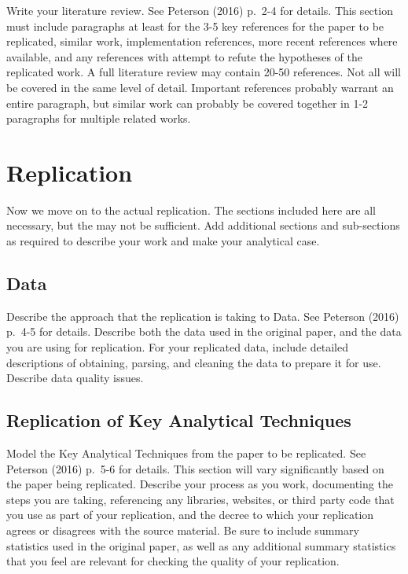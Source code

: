 \documentclass{article}
\begin{document}
Write your literature review. See Peterson (2016) p.~2-4 for details.
This section must include paragraphs at least for the 3-5 key references
for the paper to be replicated, similar work, implementation references,
more recent references where available, and any references with attempt
to refute the hypotheses of the replicated work. A full literature
review may contain 20-50 references. Not all will be covered in the same
level of detail. Important references probably warrant an entire
paragraph, but similar work can probably be covered together in 1-2
paragraphs for multiple related works.

\hypertarget{replication}{%
\section{Replication}\label{replication}}

Now we move on to the actual replication. The sections included here are
all necessary, but the may not be sufficient. Add additional sections
and sub-sections as required to describe your work and make your
analytical case.

\hypertarget{data}{%
\subsection{Data}\label{data}}

Describe the approach that the replication is taking to Data. See
Peterson (2016) p.~4-5 for details. Describe both the data used in the
original paper, and the data you are using for replication. For your
replicated data, include detailed descriptions of obtaining, parsing,
and cleaning the data to prepare it for use. Describe data quality
issues.

\hypertarget{replication-of-key-analytical-techniques}{%
\subsection{Replication of Key Analytical
Techniques}\label{replication-of-key-analytical-techniques}}

Model the Key Analytical Techniques from the paper to be replicated. See
Peterson (2016) p.~5-6 for details. This section will vary significantly
based on the paper being replicated. Describe your process as you work,
documenting the steps you are taking, referencing any libraries,
websites, or third party code that you use as part of your replication,
and the decree to which your replication agrees or disagrees with the
source material. Be sure to include summary statistics used in the
original paper, as well as any additional summary statistics that you
feel are relevant for checking the quality of your replication.
\end{document}
